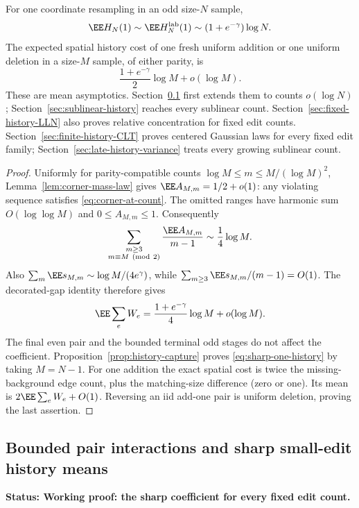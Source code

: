 \documentclass[11pt,letterpaper]{article}
\newcommand{\status}[1]{\textbf{Status: #1.}}
\begin{document}
\begin{theorem}
\label{thm:sharp-one-history}
For one coordinate resampling in an odd size-$N$ sample,
\begin{equation}\label{eq:sharp-one-history}
 \EE H_N(1)\sim\EE H_N^{\rm lab}(1)
                   \sim(1+e^{-\gamma})\log N.
\end{equation}
The expected spatial history cost of one fresh uniform addition or
one uniform deletion in a size-$M$ sample, of either parity, is
\[
 \frac{1+e^{-\gamma}}2\log M+o(\log M).
\]
These are mean asymptotics. Section~\ref{sec:small-edit-history}
first extends them to counts $o(\log N)$;
Section~\ref{sec:sublinear-history} reaches every sublinear count.
Section~\ref{sec:fixed-history-LLN} also proves relative concentration
for fixed edit counts. Section~\ref{sec:finite-history-CLT} proves centered Gaussian laws for every fixed edit family;
Section~\ref{sec:late-history-variance} treats every growing sublinear count.
\end{theorem}
\begin{proof}
Uniformly for parity-compatible counts
$\log M\le m\le M/(\log M)^2$, Lemma~\ref{lem:corner-mass-law}
gives $\EE A_{M,m}=1/2+o(1)$: any violating sequence satisfies
\eqref{eq:corner-at-count}. The omitted ranges have harmonic sum
$O(\log\log M)$ and $0\le A_{M,m}\le1$. Consequently
\[
 \sum_{\substack{m\ge3\\m\equiv M\ ({\rm mod}\ 2)}}
       \frac{\EE A_{M,m}}{m-1}\sim\frac14\log M.
\]
Also $\sum_m\EE s_{M,m}\sim\log M/(4e^\gamma)$, while
$\sum_{m\ge3}\EE s_{M,m}/(m-1)=O(1)$.
The decorated-gap identity therefore gives
\[
 \EE\sum_eW_e
     =\frac{1+e^{-\gamma}}4\log M+o(\log M).
\]
The final even pair and the bounded terminal odd stages do not affect
the coefficient. Proposition~\ref{prop:history-capture} proves
\eqref{eq:sharp-one-history} by taking $M=N-1$.
For one addition the exact spatial cost is twice the missing-background
edge count, plus the matching-size difference (zero or one). Its mean
is $2\EE\sum_eW_e+O(1)$. Reversing an iid add-one pair is uniform
deletion, proving the last assertion.
\end{proof}

\subsection{Bounded pair interactions and sharp small-edit history means}
\label{sec:small-edit-history}

\status{Working proof: the sharp coefficient for every fixed edit count}
\end{document}
